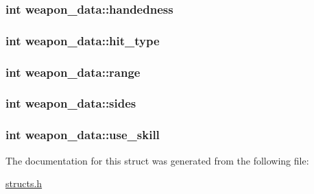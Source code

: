 \hypertarget{structweapon__data_a97586bb9d2c71f5866d21367599806bb}{
\subsubsection[{handedness}]{\setlength{\rightskip}{0pt plus 5cm}int weapon\-\_\-data\-::handedness}}\label{structweapon__data_a97586bb9d2c71f5866d21367599806bb}
\hypertarget{structweapon__data_a7d6c5a161054ce406cfdee0dafbd4ed2}{
\subsubsection[{hit\-\_\-type}]{\setlength{\rightskip}{0pt plus 5cm}int weapon\-\_\-data\-::hit\-\_\-type}}\label{structweapon__data_a7d6c5a161054ce406cfdee0dafbd4ed2}
\hypertarget{structweapon__data_a4d697901007c5cd0f604b59a5864809d}{
\subsubsection[{range}]{\setlength{\rightskip}{0pt plus 5cm}int weapon\-\_\-data\-::range}}\label{structweapon__data_a4d697901007c5cd0f604b59a5864809d}
\hypertarget{structweapon__data_acd4e98c25e656b4fdefafdc6cf3a0d07}{
\subsubsection[{sides}]{\setlength{\rightskip}{0pt plus 5cm}int weapon\-\_\-data\-::sides}}\label{structweapon__data_acd4e98c25e656b4fdefafdc6cf3a0d07}
\hypertarget{structweapon__data_a019395a4df1780650c9e614853b54019}{
\subsubsection[{use\-\_\-skill}]{\setlength{\rightskip}{0pt plus 5cm}int weapon\-\_\-data\-::use\-\_\-skill}}\label{structweapon__data_a019395a4df1780650c9e614853b54019}


The documentation for this struct was generated from the following file\-:\begin{DoxyCompactItemize}
\item 
\hyperlink{structs_8h}{structs.\-h}\end{DoxyCompactItemize}
